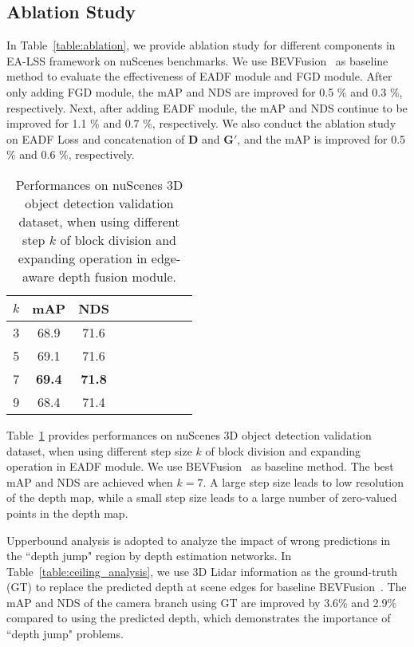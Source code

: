 \documentclass[letterpaper]{article} \usepackage[submission]{aaai24}  \usepackage{times}  \usepackage{helvet}  \usepackage{courier}  \usepackage[hyphens]{url}  \usepackage{graphicx} \urlstyle{rm} \def\UrlFont{\rm}  \usepackage{natbib}  \usepackage{caption} \frenchspacing  \setlength{\pdfpagewidth}{8.5in} \setlength{\pdfpageheight}{11in} \usepackage{algorithm}
\begin{document}
\subsection{Ablation Study}



In Table~\ref{table:ablation}, we provide ablation study for different components in EA-LSS framework on nuScenes benchmarks. We use BEVFusion~\cite{liang2022bevfusion} as baseline method to evaluate the effectiveness of EADF module and FGD module.
After only adding FGD module, the mAP and NDS are improved for 0.5 \% and 0.3 \%, respectively. Next, after adding EADF module, the mAP and NDS continue to be improved for 1.1 \% and 0.7 \%, respectively.  We also conduct the ablation study on EADF Loss and concatenation of  $\mathbf{D}$ and $\mathbf{G'}$, and the mAP is improved for 0.5 \% and 0.6 \%, respectively.   


\begin{table}
\begin{center}
\begin{tabular}{c|c|ccccccc}
\hline
$k$ &	mAP & NDS \\
\hline
3 &	68.9 &	71.6 \\
5 &	69.1 &	71.6  \\
7 &	\textbf{69.4} &	\textbf{71.8} \\
9 & 68.4 & 71.4 \\						
\hline
\end{tabular}
\end{center}
\caption{Performances on nuScenes 3D object detection validation dataset, when using different step $k$ of block division and expanding operation in edge-aware depth fusion module.}
\label{table:k}
\end{table}

Table~\ref{table:k} provides performances on nuScenes 3D object detection validation dataset, when using different step size $k$ of block division and expanding operation in EADF module. We use BEVFusion~\cite{liu2022bevfusion} as baseline method. The best mAP and NDS are achieved when $k=7$. 
A large step size leads to low resolution of the depth map, while a small step size leads to a large number of zero-valued points in the depth map.

Upperbound analysis is adopted to analyze the impact of wrong predictions in the ``depth jump" region by depth estimation networks. In Table~\ref{table:ceiling_analysis}, we use 3D Lidar information as the ground-truth (GT) to replace the predicted depth at scene edges for baseline BEVFusion~\cite{liu2022bevfusion}. The mAP and NDS of the camera branch using GT are improved by 3.6\% and 2.9\% compared to using the predicted depth, which demonstrates the importance of ``depth jump" problems.
\end{document}
